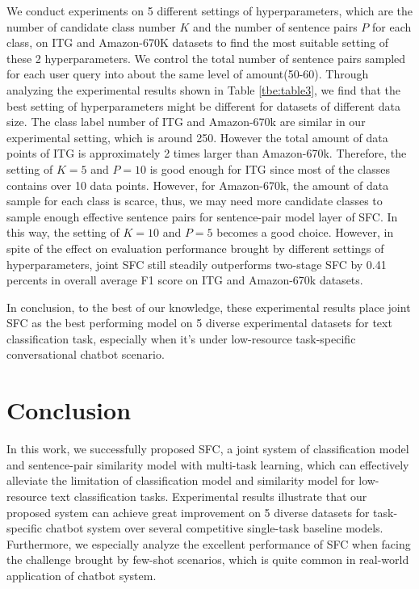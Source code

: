 \documentclass[letterpaper]{article} %
\begin{document}
  We  conduct  experiments on 5 different settings of hyperparameters, which are
  the  number of candidate class number $K$ and the number of sentence pairs $P$
  for  each  class,  on  ITG  and Amazon-670K datasets to find the most suitable
  setting  of  these  2 hyperparameters. We control the total number of sentence
  pairs  sampled for each user query into about the same level of amount(50-60).
  Through  analyzing the experimental results shown in Table \ref{tbe:table3}, we
  find  that the best setting of hyperparameters might be different for datasets
  of  different  data  size.  The  class label number of ITG and Amazon-670k are
  similar  in  our  experimental setting, which is around 250. However the total
  amount of data points of ITG is approximately 2 times larger than Amazon-670k.
  Therefore,  the  setting of $K=5$ and $P=10$ is good enough for ITG since most
  of  the  classes  contains  over 10 data points. However, for Amazon-670k, the
  amount  of  data  sample  for  each  class  is  scarce, thus, we may need more
  candidate  classes to sample enough effective sentence pairs for sentence-pair
  model  layer  of  SFC.  In this way, the setting of $K=10$ and $P=5$ becomes a
  good choice. However, in spite of the effect on evaluation performance brought
  by different settings of hyperparameters, joint SFC still steadily outperforms
  two-stage  SFC  by  0.41  percents  in  overall  average  F1 score  on  ITG and
  Amazon-670k datasets.

  In  conclusion, to the best of our knowledge, these experimental results place
  joint  SFC as the best performing model on 5 diverse experimental datasets for
  text   classification   task,   especially   when   it's   under  low-resource
  task-specific conversational chatbot scenario.

  \section{Conclusion}
  In  this  work, we successfully proposed SFC, a joint system of classification
  model  and  sentence-pair similarity model with multi-task learning, which can
  effectively  alleviate  the  limitation of classification model and similarity
  model   for  low-resource  text  classification  tasks.  Experimental  results
  illustrate that our proposed system can achieve great improvement on 5 diverse
  datasets for task-specific chatbot system over several competitive single-task
  baseline  models. Furthermore, we especially analyze the excellent performance
  of SFC when facing the challenge brought by few-shot scenarios, which is quite
  common in real-world application of chatbot system.

  
  
\end{document}

